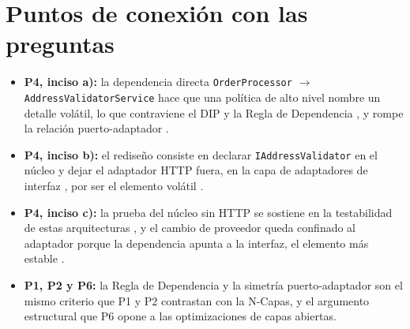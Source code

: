 \section{Puntos de conexión con las preguntas}

\begin{itemize}
  \item \textbf{P4, inciso a):} la dependencia directa \texttt{OrderProcessor}
        $\rightarrow$ \texttt{AddressValidatorService} hace que una política de alto nivel
        nombre un detalle volátil, lo que contraviene el DIP \parencite[87]{martin2017} y la
        Regla de Dependencia \parencite[203]{martin2017}, y rompe la relación puerto-adaptador
        \parencite{cockburn2005}.
  \item \textbf{P4, inciso b):} el rediseño consiste en declarar \texttt{IAddressValidator} en
        el núcleo y dejar el adaptador HTTP fuera, en la capa de adaptadores de interfaz
        \parencite[205]{martin2017}, por ser el elemento volátil \parencite[88]{martin2017}.
  \item \textbf{P4, inciso c):} la prueba del núcleo sin HTTP se sostiene en la testabilidad de
        estas arquitecturas \parencite[202]{martin2017}, y el cambio de proveedor queda
        confinado al adaptador porque la dependencia apunta a la interfaz, el elemento más
        estable \parencite[88]{martin2017}.
  \item \textbf{P1, P2 y P6:} la Regla de Dependencia y la simetría puerto-adaptador son el
        mismo criterio que P1 y P2 contrastan con la N-Capas, y el argumento estructural que P6
        opone a las optimizaciones de capas abiertas.
\end{itemize}


